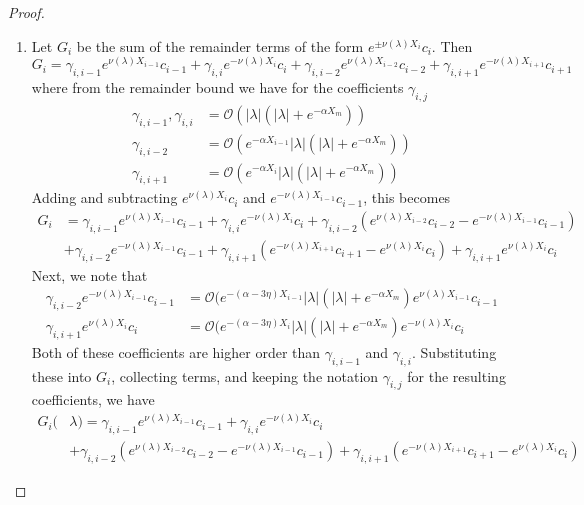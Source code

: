 \documentclass[thesis.tex]{subfiles}
\begin{document}
\begin{lemma}
\begin{proof}
\begin{enumerate}
\item Let $G_i$ be the sum of the remainder terms of the form $e^{\pm \nu(\lambda) X_i} c_i$. Then 
\[
G_i = \gamma_{i,i-1} e^{\nu(\lambda)X_{i-1}}c_{i-1} + \gamma_{i,i} e^{-\nu(\lambda)X_i}c_i + \gamma_{i,i-2} e^{\nu(\lambda)X_{i-2}}c_{i-2} + \gamma_{i,i+1} e^{-\nu(\lambda)X_{i+1}}c_{i+1}
\] 
where from the remainder bound we have for the coefficients $\gamma_{i, j}$
\begin{align*}
\gamma_{i,i-1}, \gamma_{i,i} &= \mathcal{O}(|\lambda|(|\lambda| + e^{-\alpha X_m})) \\
\gamma_{i,i-2} &= \mathcal{O}(e^{-\alpha X_{i-1}}|\lambda|(|\lambda| + e^{-\alpha X_m})) \\
\gamma_{i,i+1} &= \mathcal{O}(e^{-\alpha X_i}|\lambda|(|\lambda| + e^{-\alpha X_m}))
\end{align*}
Adding and subtracting $e^{\nu(\lambda)X_i}c_i$ and $e^{-\nu(\lambda)X_{i-1}}c_{i-1}$, this becomes
\begin{align*}
G_i &= \gamma_{i,i-1} e^{\nu(\lambda)X_{i-1}}c_{i-1} + \gamma_{i,i} e^{-\nu(\lambda)X_i}c_i + \gamma_{i,i-2} ( e^{\nu(\lambda)X_{i-2}}c_{i-2} - e^{-\nu(\lambda)X_{i-1}}c_{i-1}) \\
&+ \gamma_{i,i-2} e^{-\nu(\lambda)X_{i-1}}c_{i-1} + \gamma_{i,i+1} (e^{-\nu(\lambda)X_{i+1}}c_{i+1} - e^{\nu(\lambda)X_i}c_i) + \gamma_{i,i+1} e^{\nu(\lambda)X_i}c_i
\end{align*}
Next, we note that
\begin{align*}
\gamma_{i,i-2} e^{-\nu(\lambda)X_{i-1}}c_{i-1} &= \mathcal{O}(e^{-(\alpha - 3 \eta) X_{i-1}}|\lambda|(|\lambda| + e^{-\alpha X_m})e^{\nu(\lambda)X_{i-1}}c_{i-1} \\
\gamma_{i,i+1} e^{\nu(\lambda)X_i}c_i &= \mathcal{O}(e^{-(\alpha - 3 \eta) X_i}|\lambda|(|\lambda| + e^{-\alpha X_m})e^{-\nu(\lambda)X_i}c_i
\end{align*}
Both of these coefficients are higher order than $\gamma_{i,i-1}$ and $\gamma_{i,i}$. Substituting these into $G_i$, collecting terms, and keeping the notation $\gamma_{i,j}$ for the resulting coefficients, we have
\begin{align*}
G_i(&\lambda) = \gamma_{i,i-1} e^{\nu(\lambda)X_{i-1}}c_{i-1} + \gamma_{i,i} e^{-\nu(\lambda)X_i}c_i \\
&+ \gamma_{i,i-2} ( e^{\nu(\lambda)X_{i-2}}c_{i-2} - e^{-\nu(\lambda)X_{i-1}}c_{i-1}) + \gamma_{i,i+1} (e^{-\nu(\lambda)X_{i+1}}c_{i+1} - e^{\nu(\lambda)X_i}c_i)
\end{align*}

\end{enumerate}
\end{proof}
\end{lemma}
\end{document}
